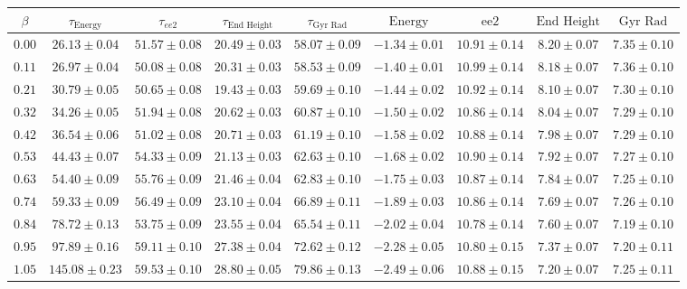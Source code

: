 \begin{sidewaystable}[t!]
    \centering
    \begin{tabular}{|c|c|c|c|c|c|c|c|c|}
    \hline
    $\beta$ & $\tau_{\text{Energy}}$ & $\tau_{ee2}$ & $\tau_{\text{End Height}}$ & $\tau_{\text{Gyr Rad}}$ & $\text{Energy}$ & $\text{ee2}$ & $\text{End Height}$ & $\text{Gyr Rad}$ \\        
    \hline
    $0.00$ & $26.13 \pm 0.04$ & $51.57 \pm 0.08$ & $20.49 \pm 0.03$ & $58.07 \pm 0.09$ & $-1.34 \pm 0.01$ & $10.91 \pm 0.14$ & $8.20 \pm 0.07$ & $7.35 \pm 0.10$ \\
    \hline
    $0.11$ & $26.97 \pm 0.04$ & $50.08 \pm 0.08$ & $20.31 \pm 0.03$ & $58.53 \pm 0.09$ & $-1.40 \pm 0.01$ & $10.99 \pm 0.14$ & $8.18 \pm 0.07$ & $7.36 \pm 0.10$ \\
    \hline
    $0.21$ & $30.79 \pm 0.05$ & $50.65 \pm 0.08$ & $19.43 \pm 0.03$ & $59.69 \pm 0.10$ & $-1.44 \pm 0.02$ & $10.92 \pm 0.14$ & $8.10 \pm 0.07$ & $7.30 \pm 0.10$ \\
    \hline
    $0.32$ & $34.26 \pm 0.05$ & $51.94 \pm 0.08$ & $20.62 \pm 0.03$ & $60.87 \pm 0.10$ & $-1.50 \pm 0.02$ & $10.86 \pm 0.14$ & $8.04 \pm 0.07$ & $7.29 \pm 0.10$ \\
    \hline
    $0.42$ & $36.54 \pm 0.06$ & $51.02 \pm 0.08$ & $20.71 \pm 0.03$ & $61.19 \pm 0.10$ & $-1.58 \pm 0.02$ & $10.88 \pm 0.14$ & $7.98 \pm 0.07$ & $7.29 \pm 0.10$ \\
    \hline
    $0.53$ & $44.43 \pm 0.07$ & $54.33 \pm 0.09$ & $21.13 \pm 0.03$ & $62.63 \pm 0.10$ & $-1.68 \pm 0.02$ & $10.90 \pm 0.14$ & $7.92 \pm 0.07$ & $7.27 \pm 0.10$ \\
    \hline
    $0.63$ & $54.40 \pm 0.09$ & $55.76 \pm 0.09$ & $21.46 \pm 0.04$ & $62.83 \pm 0.10$ & $-1.75 \pm 0.03$ & $10.87 \pm 0.14$ & $7.84 \pm 0.07$ & $7.25 \pm 0.10$ \\
    \hline
    $0.74$ & $59.33 \pm 0.09$ & $56.49 \pm 0.09$ & $23.10 \pm 0.04$ & $66.89 \pm 0.11$ & $-1.89 \pm 0.03$ & $10.86 \pm 0.14$ & $7.69 \pm 0.07$ & $7.26 \pm 0.10$ \\
    \hline
    $0.84$ & $78.72 \pm 0.13$ & $53.75 \pm 0.09$ & $23.55 \pm 0.04$ & $65.54 \pm 0.11$ & $-2.02 \pm 0.04$ & $10.78 \pm 0.14$ & $7.60 \pm 0.07$ & $7.19 \pm 0.10$ \\
    \hline
    $0.95$ & $97.89 \pm 0.16$ & $59.11 \pm 0.10$ & $27.38 \pm 0.04$ & $72.62 \pm 0.12$ & $-2.28 \pm 0.05$ & $10.80 \pm 0.15$ & $7.37 \pm 0.07$ & $7.20 \pm 0.11$ \\
    \hline
    $1.05$ & $145.08 \pm 0.23$ & $59.53 \pm 0.10$ & $28.80 \pm 0.05$ & $79.86 \pm 0.13$ & $-2.49 \pm 0.06$ & $10.88 \pm 0.15$ & $7.20 \pm 0.07$ & $7.25 \pm 0.11$ \\

\end{tabular}
\end{sidewaystable}
